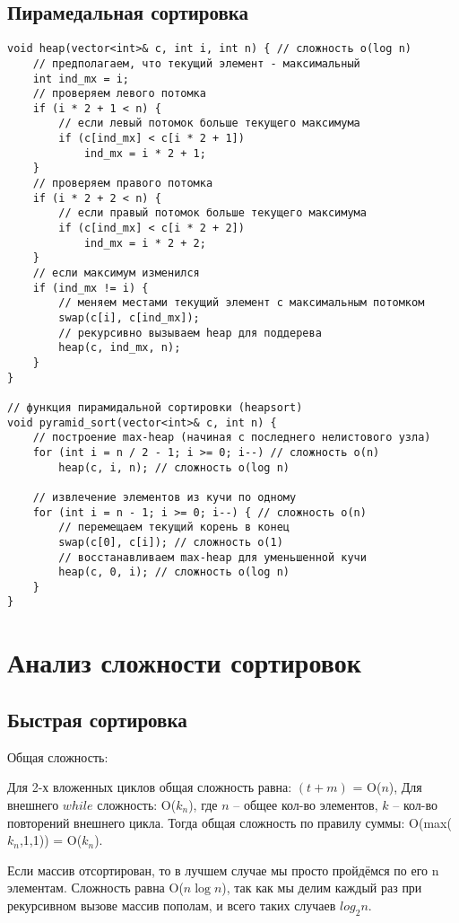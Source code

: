 \documentclass[otchet]{SCWorks}
\begin{document}
\subsection{Пирамедальная сортировка}
\begin{verbatim}
void heap(vector<int>& c, int i, int n) { // сложность o(log n)
    // предполагаем, что текущий элемент - максимальный
    int ind_mx = i;
    // проверяем левого потомка
    if (i * 2 + 1 < n) {
        // если левый потомок больше текущего максимума
        if (c[ind_mx] < c[i * 2 + 1])
            ind_mx = i * 2 + 1;
    }
    // проверяем правого потомка
    if (i * 2 + 2 < n) {
        // если правый потомок больше текущего максимума
        if (c[ind_mx] < c[i * 2 + 2])
            ind_mx = i * 2 + 2;
    }
    // если максимум изменился
    if (ind_mx != i) {
        // меняем местами текущий элемент с максимальным потомком
        swap(c[i], c[ind_mx]);
        // рекурсивно вызываем heap для поддерева
        heap(c, ind_mx, n);
    }
}

// функция пирамидальной сортировки (heapsort)
void pyramid_sort(vector<int>& c, int n) {
    // построение max-heap (начиная с последнего нелистового узла)
    for (int i = n / 2 - 1; i >= 0; i--) // сложность o(n)
        heap(c, i, n); // сложность o(log n)

    // извлечение элементов из кучи по одному
    for (int i = n - 1; i >= 0; i--) { // сложность o(n)
        // перемещаем текущий корень в конец
        swap(c[0], c[i]); // сложность o(1)
        // восстанавливаем max-heap для уменьшенной кучи
        heap(c, 0, i); // сложность o(log n)
    }
}
\end{verbatim}

\section{Анализ сложности сортировок}
\subsection{Быстрая сортировка}

Общая сложность: 

Для 2-х вложенных циклов общая сложность равна: $(t + m)$ = O($n$), Для внешнего
$while$ сложность: O($k_n$), где $n$ – общее кол-во элементов, $k$ – кол-во повторений
внешнего цикла. Тогда общая сложность по правилу суммы: O(max($k_n$,1,1)) = O($k_n$).


Если массив отсортирован, то в лучшем случае мы просто пройдёмся по его
n элементам. Сложность равна O($n \log n$), так как мы делим каждый раз при
рекурсивном вызове массив пополам, и всего таких случаев $log_2 n$.
\end{document}
